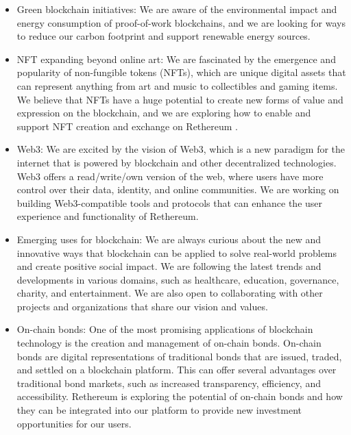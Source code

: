 \documentclass[a4paper,onecolumn, superscriptaddress,10pt,accepted=2020-05-01,issue=1, volume=2, shorttitle=papers]{compositionalityarticle}
\begin{document}
\begin{itemize}
    \item Green blockchain initiatives: We are aware of the environmental impact and energy consumption of proof-of-work blockchains, and we are looking for ways to reduce our carbon footprint and support renewable energy sources.
\end{itemize}
\begin{itemize}
    \item NFT expanding beyond online art: We are fascinated by the emergence and popularity of non-fungible tokens (NFTs), which are unique digital assets that can represent anything from art and music to collectibles and gaming items. We believe that NFTs have a huge potential to create new forms of value and expression on the blockchain, and we are exploring how to enable and support NFT creation and exchange on Rethereum .
\end{itemize}
\begin{itemize}
    \item Web3: We are excited by the vision of Web3, which is a new paradigm for the internet that is powered by blockchain and other decentralized technologies. Web3 offers a read/write/own version of the web, where users have more control over their data, identity, and online communities. We are working on building Web3-compatible tools and protocols that can enhance the user experience and functionality of Rethereum.
\end{itemize}
\begin{itemize}
    \item Emerging uses for blockchain: We are always curious about the new and innovative ways that blockchain can be applied to solve real-world problems and create positive social impact. We are following the latest trends and developments in various domains, such as healthcare, education, governance, charity, and entertainment. We are also open to collaborating with other projects and organizations that share our vision and values.
\end{itemize}
\begin{itemize}
    \item On-chain bonds: One of the most promising applications of blockchain technology is the creation and management of on-chain bonds. On-chain bonds are digital representations of traditional bonds that are issued, traded, and settled on a blockchain platform. This can offer several advantages over traditional bond markets, such as increased transparency, efficiency, and accessibility. Rethereum is exploring the potential of on-chain bonds and how they can be integrated into our platform to provide new investment opportunities for our users.
\end{itemize}
\end{document}
